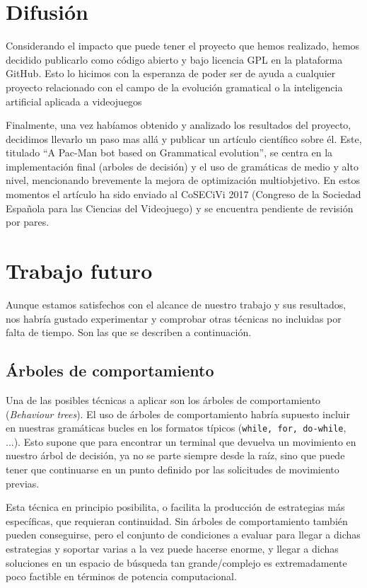 \section{Difusión}
Considerando el impacto que puede tener el proyecto que hemos realizado, hemos decidido publicarlo \cite{thesisGit} como código abierto y bajo licencia GPL \cite{licenseThesisGit} en la plataforma GitHub. Esto lo hicimos con la esperanza de poder ser de ayuda a cualquier proyecto relacionado con el campo de la evolución gramatical o la inteligencia artificial aplicada a videojuegos

Finalmente, una vez habíamos obtenido y analizado los resultados del proyecto, decidimos llevarlo un paso mas allá y publicar un artículo científico sobre él. Este, titulado ``A Pac-Man bot based on Grammatical evolution'', se centra en la implementación final (arboles de decisión) y el uso de gramáticas de medio y alto nivel, mencionando brevemente la mejora de optimización multiobjetivo. En estos momentos el artículo ha sido enviado al CoSECiVi 2017 (Congreso de la Sociedad Española para las Ciencias del Videojuego) y se encuentra pendiente de revisión por pares.

\section{Trabajo futuro}
Aunque estamos satisfechos con el alcance de nuestro trabajo y sus resultados, nos habría gustado experimentar y comprobar otras técnicas no incluidas por falta de tiempo. Son las que se describen a continuación.

\subsection{Árboles de comportamiento}
Una de las posibles técnicas a aplicar son los árboles de comportamiento (\textit{Behaviour trees}). 
El uso de árboles de comportamiento habría supuesto incluir en nuestras gramáticas bucles en los formatos típicos (\texttt{while, for, do-while}, ...). Esto supone que para encontrar un terminal que devuelva un movimiento en nuestro árbol de decisión, ya no se parte siempre desde la raíz, sino que puede tener que continuarse en un punto definido por las solicitudes de movimiento previas.

Esta técnica en principio posibilita, o facilita la producción de estrategias más específicas, que requieran continuidad. Sin árboles de comportamiento también pueden conseguirse, pero el conjunto de condiciones a evaluar para llegar a dichas estrategias y soportar varias a la vez puede hacerse enorme, y llegar a dichas soluciones en un espacio de búsqueda tan grande/complejo es extremadamente poco factible en términos de potencia computacional.

